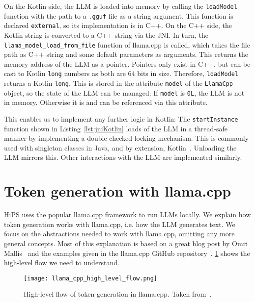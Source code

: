 On the Kotlin side, the \gls{LLM} is loaded into memory by calling the \lstinline|loadModel| function with the path to a \lstinline|.gguf| file as a string argument. This function is declared \lstinline|external|, so its implementation is in C++. On the C++ side, the Kotlin string is converted to a C++ string via the \gls{JNI}. In turn, the \lstinline|llama_model_load_from_file| function of llama.cpp is called, which takes the file path as C++ string and some default parameters as arguments. This returns the memory address of the \gls{LLM} as a pointer. Pointers only exist in C++, but can be cast to Kotlin \lstinline|long| numbers as both are 64 bits in size. Therefore, \lstinline|loadModel| returns a Kotlin \lstinline|long|. This is stored in the attribute \lstinline|model| of the \lstinline|LlamaCpp| object, so the state of the \gls{LLM} can be managed: If \lstinline|model| is \lstinline|0L|, the \gls{LLM} is not in memory. Otherwise it is and can be referenced via this attribute.

This enables us to implement any further logic in Kotlin: The \lstinline|startInstance| function shown in Listing~\ref{lst:jniKotlin} loads of the \gls{LLM} in a thread-safe manner by implementing a double-checked locking mechanism. This is commonly used with singleton classes in Java, and by extension, Kotlin~\cite{ishizakiTransformingJavaPrograms2014}. Unloading the \gls{LLM} mirrors this. Other interactions with the \gls{LLM} are implemented similarly.

\section{Token generation with llama.cpp}
\label{sec:tokenGenerationWithLlamaCpp}
\gls{HiPS} uses the popular llama.cpp framework to run \glspl{LLM} locally. We explain how token generation works with llama.cpp, i.e. how the \gls{LLM} generates text. We focus on the abstractions needed to work with llama.cpp, omitting any more general concepts. Most of this explanation is based on a great blog post by Omri Mallis~\cite{mallisUnderstandingHowLLM2023} and the examples given in the llama.cpp GitHub repository~\cite{gerganovGgerganovLlamacpp2024}. \cref{fig:llamaCppHighLevelFlow} shows the high-level flow we need to understand.

\begin{figure}
    \centering
    \captionsetup{width=\linewidth}
    \texttt{[image: llama\_cpp\_high\_level\_flow.png]}
    \caption[llama.cpp: Token generation]{High-level flow of token generation in llama.cpp. Taken from~\cite{mallisUnderstandingHowLLM2023}.}
    \label{fig:llamaCppHighLevelFlow}
\end{figure}


